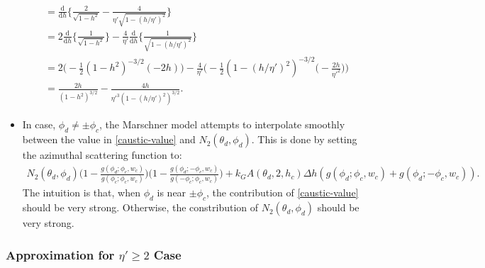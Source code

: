 \documentclass[10pt]{article}
\newcommand{\dee}{\mathrm{d}}
\begin{document}
\begin{itemize}
\begin{align*}
        &= \frac{\dee}{\dee h} \bigg\{ \frac{2}{\sqrt{1-h^2}} - \frac{4}{\eta' \sqrt{1-(h/\eta')^2}} \bigg\}\\
        &= 2 \frac{\dee}{\dee h}\bigg\{ \frac{1}{\sqrt{1 - h^2}} \bigg\}
        - \frac{4}{\eta'} \frac{\dee}{\dee h}\bigg\{ 
          \frac{1}{\sqrt{1 - (h/\eta')^2}}\bigg\}\\
        &= 2 \bigg( -\frac{1}{2} (1 - h^2)^{-3/2} (-2h) \bigg)
          - \frac{4}{\eta'} \bigg( -\frac{1}{2} (1 - (h/\eta')^2)^{-3/2} \bigg( - \frac{2h}{\eta'^2} \bigg) \bigg)\\
        &= \frac{2h}{(1-h^2)^{3/2}} - \frac{4h}{\eta'^3 (1 - (h/\eta')^2)^{3/2}}.
      \end{align*}
      
    \item In case, $\phi_d \neq \pm \phi_c$, the Marschner model
      attempts to interpolate smoothly between the value
      in \eqref{caustic-value} and $N_2(\theta_d, \phi_d)$.
      This is done by setting the azimuthal scattering function to:
      \begin{align*}
        N_2(\theta_d, \phi_d) \bigg(1 - \frac{g(\phi_d;\phi_c, w_c)}{g(\phi_c; \phi_c, w_c)}\bigg) \bigg( 1 - \frac{g(\phi_d;-\phi_c,w_c)}{g(-\phi_c;\phi_c,w_c)} \bigg) + 
        k_G A(\theta_d, 2, h_c) \Delta h (g(\phi_d; \phi_c, w_c) +
        g(\phi_d; -\phi_c, w_c)).
      \end{align*}
      The intuition is that, when $\phi_d$ is near $\pm \phi_c$,
      the contribution of \eqref{caustic-value} should be
      very strong. Otherwise, the constribution of 
      $N_2(\theta_d, \phi_d)$ should be very strong.
  \end{itemize}
  
  \subsubsection{Approximation for $\eta' \geq 2$ Case}
  
\end{document}
